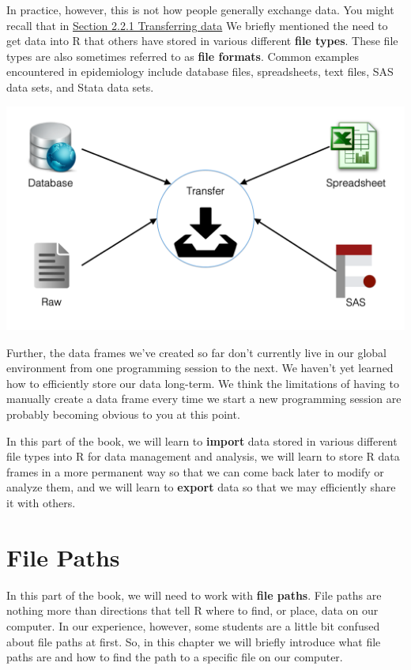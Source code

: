 \documentclass[
  letterpaper,
  DIV=11,
  numbers=noendperiod]{scrreprt}
\begin{document}
In practice, however, this is not how people generally exchange data.
You might recall that in \hyperref[transferring-data]{Section 2.2.1
Transferring data} We briefly mentioned the need to get data into R that
others have stored in various different \textbf{file types}. These file
types are also sometimes referred to as \textbf{file formats}. Common
examples encountered in epidemiology include database files,
spreadsheets, text files, SAS data sets, and Stata data sets.

\includegraphics{chapters/data_transfer/competencies_transfer.png}

Further, the data frames we've created so far don't currently live in
our global environment from one programming session to the next. We
haven't yet learned how to efficiently store our data long-term. We
think the limitations of having to manually create a data frame every
time we start a new programming session are probably becoming obvious to
you at this point.

In this part of the book, we will learn to \textbf{import} data stored
in various different file types into R for data management and analysis,
we will learn to store R data frames in a more permanent way so that we
can come back later to modify or analyze them, and we will learn to
\textbf{export} data so that we may efficiently share it with others.

\chapter{File Paths}\label{file-paths}

In this part of the book, we will need to work with \textbf{file paths}.
File paths are nothing more than directions that tell R where to find,
or place, data on our computer. In our experience, however, some
students are a little bit confused about file paths at first. So, in
this chapter we will briefly introduce what file paths are and how to
find the path to a specific file on our computer.
\end{document}
